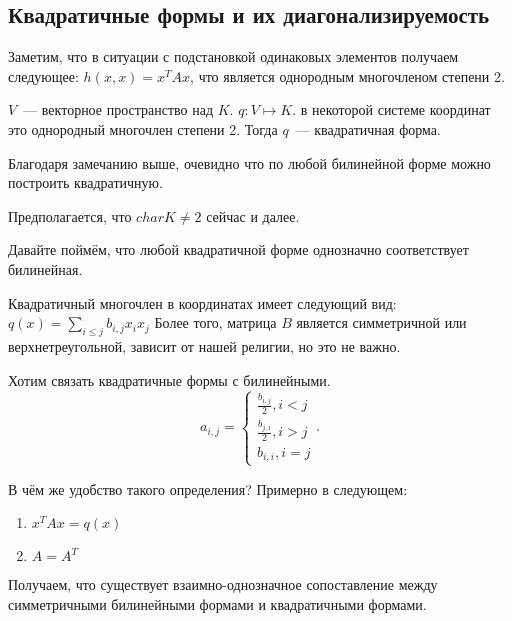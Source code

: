\subsection{Квадратичные формы и их диагонализируемость}
\begin{remark}
    Заметим, что в ситуации с подстановкой одинаковых элементов получаем следующее:
    $h(x,x) = x^TAx$, что является однородным многочленом степени 2.
\end{remark}
\begin{definition}
    $V$~--- векторное пространство над $K$. $q\colon V\mapsto K$. 
    в некоторой системе координат это однородный многочлен степени 2.
    Тогда $q$~--- квадратичная форма.
\end{definition}
Благодаря замечанию выше, очевидно что по любой билинейной форме можно построить
квадратичную.
\begin{remark}
    Предполагается, что $char K \not= 2$ сейчас и далее.
\end{remark}
Давайте поймём, что любой квадратичной форме однозначно соответствует билинейная.
\begin{remark}
    Квадратичный многочлен в координатах имеет следующий вид:
    $q(x) = \sum\limits_{i\le j}^{}{b_{i,j} x_i x_j}$
    Более того, матрица $B$ является симметричной или верхнетреугольной, зависит от
    нашей религии, но это не важно.
\end{remark}
Хотим связать квадратичные формы с билинейными.
 \[
 a_{i,j} = 
 \begin{cases}
     \frac{b_{i,j}}{2}, i < j\\
     \frac{b_{j,i}}{2}, i > j\\
     b_{i,i}, i = j
 \end{cases}
.\] 

В чём же удобство такого определения? Примерно в следующем:
\begin{enumerate}
    \item
        $x^TAx = q(x)$
    \item
         $A = A^T$
\end{enumerate}
Получаем, что существует взаимно-однозначное сопоставление между
симметричными билинейными формами и квадратичными формами.

